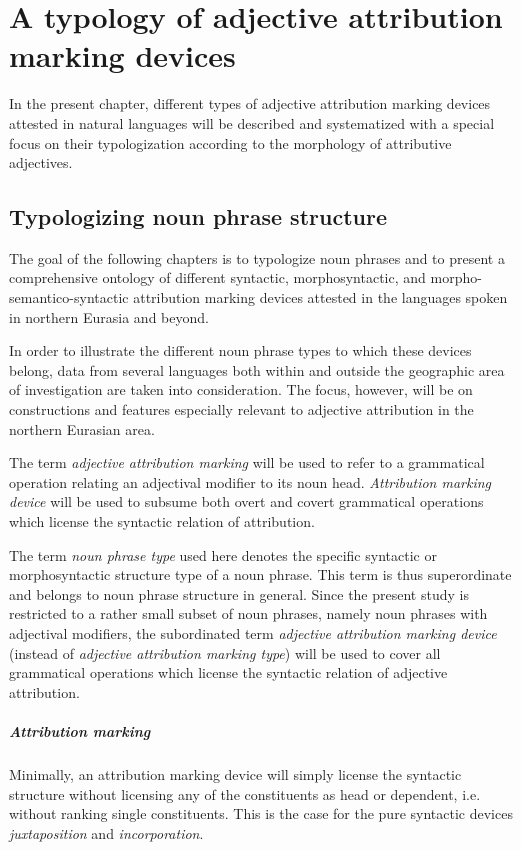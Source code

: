 
\chapter[Typology of attribution marking]{A typology of adjective attribution marking devices} \label{ontology}
In the present chapter, different types of adjective attribution marking devices attested in natural languages will be described and systematized with a special focus on their typologization according to the morphology of attributive adjectives.

\section{Typologizing noun phrase structure}
The goal of the following chapters is to typologize noun phrases and to present a comprehensive ontology of different syntactic, morphosyntactic, and morpho-semantico-syntactic attribution marking devices attested in the languages spoken in northern Eurasia and beyond. 

In order to illustrate the different noun phrase types to which these devices belong, data from several languages both within and outside the geographic area of investigation are taken into consideration. The focus, however, will be on constructions and features especially relevant to adjective attribution in the northern Eurasian area.

The term \emph{adjective attribution marking} will be used to refer to a grammatical operation relating an adjectival modifier to its noun head. \emph{Attribution marking device} will be used to subsume both overt and covert grammatical operations which license the syntactic relation of attribution. 

The term \emph{noun phrase type} used here denotes the specific syntactic or morphosyntactic structure type of a noun phrase. This term is thus superordinate and belongs to noun phrase structure in general. Since the present study is restricted to a rather small subset of noun phrases, namely noun phrases with adjectival modifiers, the subordinated term \emph{adjective attribution marking device} (instead of \emph{adjective attribution marking type}) will be used to cover all grammatical operations which license the syntactic relation of adjective attribution.

\paragraph{Attribution marking} Minimally, an attribution marking device will simply license the syntactic structure without licensing any of the constituents as head or dependent, i.e. without ranking single constituents. This is the case for the pure syntactic devices \emph{juxtaposition} and \emph{incorporation}.

